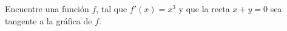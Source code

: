 \item Encuentre una función $f$, tal que $f'(x) = x^3$ y que la recta $x + y = 0$ sea tangente a la gráfica de $f$.
